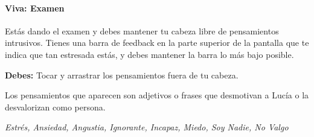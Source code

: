 \paragraph{Viva: Examen}
Estás dando el examen y debes mantener tu cabeza libre de pensamientos intrusivos. Tienes una barra de feedback en la parte superior de la pantalla que te indica que tan estresada estás, y debes mantener la barra lo más bajo posible.

\textbf{Debes:} Tocar y arrastrar los pensamientos fuera de tu cabeza.

Los pensamientos que aparecen son adjetivos o frases que desmotivan a Lucía o la desvalorizan como persona.
\begin{center}
    \textit{Estrés, Ansiedad, Angustia, Ignorante, Incapaz, Miedo, Soy Nadie, No Valgo}
\end{center}

